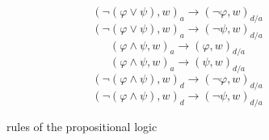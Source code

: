\documentclass[a4paper,american]{paper}
\begin{document}
\begin{figure}[H]
	\begin{equation}
		(\neg (\varphi\vee\psi ),w)_a\rightarrow (\neg\varphi ,w)_{d/a}
	\end{equation}
	\begin{equation}
		(\neg (\varphi\vee\psi ),w)_a\rightarrow (\neg\psi ,w)_{d/a}
	\end{equation}
	\begin{equation}
		(\varphi\wedge\psi ,w)_a\rightarrow (\varphi ,w)_{d/a}
	\end{equation}
	\begin{equation}
		(\varphi\wedge\psi ,w)_a\rightarrow (\psi ,w)_{d/a}
	\end{equation}
	\begin{equation}
		(\neg (\varphi\wedge\psi ),w)_d\rightarrow (\neg\varphi ,w)_{d/a}
	\end{equation}
	\begin{equation}
		(\neg (\varphi\wedge\psi ),w)_d\rightarrow (\neg\psi ,w)_{d/a}
	\end{equation}
	\caption{rules of the propositional logic}
	\label{fig:rules}
\end{figure}
\end{document}
